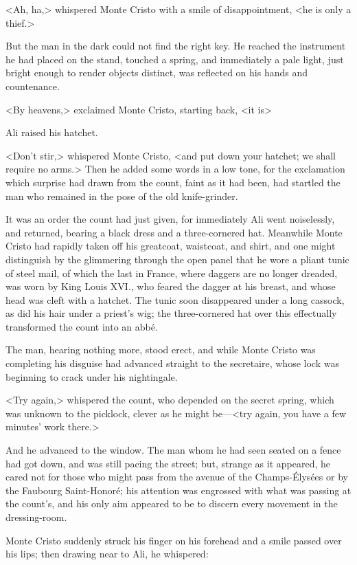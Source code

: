  <Ah, ha,> whispered Monte Cristo with a smile of disappointment, <he is only a thief.> 

 But the man in the dark could not find the right key. He reached the instrument he had placed on the stand, touched a spring, and immediately a pale light, just bright enough to render objects distinct, was reflected on his hands and countenance. 

 <By heavens,> exclaimed Monte Cristo, starting back, <it is\longdash> 

 Ali raised his hatchet. 

 <Don't stir,> whispered Monte Cristo, <and put down your hatchet; we shall require no arms.>  Then he added some words in a low tone, for the exclamation which surprise had drawn from the count, faint as it had been, had startled the man who remained in the pose of the old knife-grinder. 

 It was an order the count had just given, for immediately Ali went noiselessly, and returned, bearing a black dress and a three-cornered hat. Meanwhile Monte Cristo had rapidly taken off his greatcoat, waistcoat, and shirt, and one might distinguish by the glimmering through the open panel that he wore a pliant tunic of steel mail, of which the last in France, where daggers are no longer dreaded, was worn by King Louis XVI., who feared the dagger at his breast, and whose head was cleft with a hatchet. The tunic soon disappeared under a long cassock, as did his hair under a priest's wig; the three-cornered hat over this effectually transformed the count into an abbé. 

 The man, hearing nothing more, stood erect, and while Monte Cristo was completing his disguise had advanced straight to the secretaire, whose lock was beginning to crack under his nightingale. 

 <Try again,> whispered the count, who depended on the secret spring, which was unknown to the picklock, clever as he might be—<try again, you have a few minutes' work there.> 

 And he advanced to the window. The man whom he had seen seated on a fence had got down, and was still pacing the street; but, strange as it appeared, he cared not for those who might pass from the avenue of the Champs-Élysées or by the Faubourg Saint-Honoré; his attention was engrossed with what was passing at the count's, and his only aim appeared to be to discern every movement in the dressing-room. 

 Monte Cristo suddenly struck his finger on his forehead and a smile passed over his lips; then drawing near to Ali, he whispered: 

